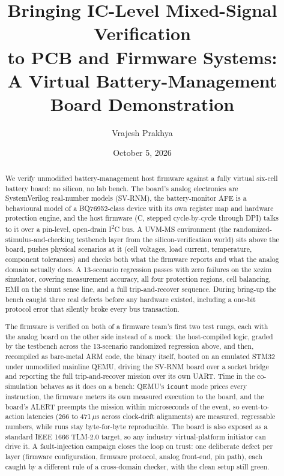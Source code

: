 \documentclass[11pt]{article}
\title{\bfseries Bringing IC-Level Mixed-Signal Verification\\
       to PCB and Firmware Systems:\\
       \large A Virtual Battery-Management Board Demonstration}
\author{Vrajesh Prakhya}
\date{October 5, 2026}
\newcommand{\iic}{I\textsuperscript{2}C}
\begin{document}
\maketitle

\begin{abstract}
\noindent
We verify unmodified battery-management host firmware against a fully
virtual six-cell battery board: no silicon, no lab bench.  The
board's analog electronics are SystemVerilog real-number models
(SV-RNM), the battery-monitor AFE is a behavioural model of a
BQ76952-class device with its own register map and hardware protection
engine, and the host firmware (C, stepped cycle-by-cycle through DPI)
talks to it over a pin-level, open-drain \iic{} bus.  A UVM-MS
environment (the randomized-stimulus-and-checking testbench layer
from the silicon-verification world) sits above the board,
pushes physical scenarios at it (cell voltages, load current,
temperature, component tolerances) and checks both what the firmware
reports and what the analog domain actually does.  A 13-scenario regression passes with zero failures on
the xezim simulator, covering measurement accuracy, all four
protection regions, cell balancing, EMI on the shunt sense line, and a
full trip-and-recover sequence.  During bring-up the bench caught
three real defects before any hardware existed, including a one-bit
protocol error that silently broke every bus transaction.

The firmware is verified on both of a firmware team's first two
test rungs, each with the analog board on the other side instead of
a mock: the host-compiled logic, graded by the testbench across the
13-scenario randomized regression above, and then, recompiled as
bare-metal ARM code, the binary itself, booted
on an emulated STM32 under unmodified mainline QEMU, driving the
SV-RNM board over a socket bridge and reporting the full
trip-and-recover mission over its own UART.  Time in the
co-simulation behaves as it does on a bench: QEMU's \texttt{icount}
mode prices every instruction, the firmware meters its own measured
execution to the board, and the board's ALERT preempts the mission
within microseconds of the event, so event-to-action latencies
(266 to 471\,$\mu$s across clock-drift alignments) are measured,
regressable numbers, while runs stay byte-for-byte reproducible.  The board is also exposed as a standard IEEE 1666
TLM-2.0 target, so any industry virtual-platform initiator can
drive it.  A fault-injection
campaign closes the loop on trust: one deliberate defect per layer
(firmware configuration, firmware protocol, analog front-end, pin
path), each caught by a different rule of a cross-domain checker,
with the clean setup still green.
\end{abstract}
\end{document}
